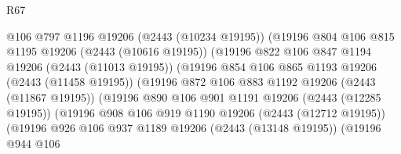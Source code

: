 \begin{lexlean}{R67}
\begin{coremodule}
                              @106
                              @797
                              @1196
                              @19206
                              (@2443 (@10234 @19195))
                              (@19196
                                @804
                                @106
                                @815
                                @1195
                                @19206
                                (@2443 (@10616 @19195))
                                (@19196
                                  @822
                                  @106
                                  @847
                                  @1194
                                  @19206
                                  (@2443 (@11013 @19195))
                                  (@19196
                                    @854
                                    @106
                                    @865
                                    @1193
                                    @19206
                                    (@2443 (@11458 @19195))
                                    (@19196
                                      @872
                                      @106
                                      @883
                                      @1192
                                      @19206
                                      (@2443 (@11867 @19195))
                                      (@19196
                                        @890
                                        @106
                                        @901
                                        @1191
                                        @19206
                                        (@2443 (@12285 @19195))
                                        (@19196
                                          @908
                                          @106
                                          @919
                                          @1190
                                          @19206
                                          (@2443 (@12712 @19195))
                                          (@19196
                                            @926
                                            @106
                                            @937
                                            @1189
                                            @19206
                                            (@2443 (@13148 @19195))
                                            (@19196
                                              @944
                                              @106

\end{coremodule}
\end{lexlean}
